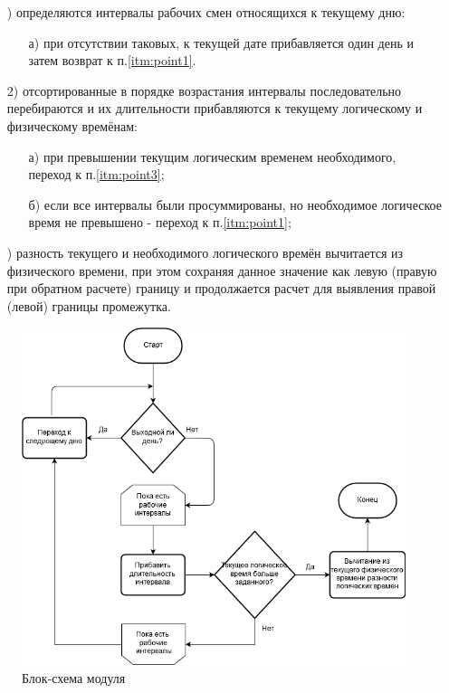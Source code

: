 \begin{enumerate}
	\item[\mylabel{itm:point1}{1})] определяются интервалы рабочих смен относящихся к текущему дню:
	      \begin{enumerate}
		      \item[а)] при отсутствии таковых, к текущей дате прибавляется один день и затем возврат к п.\ref{itm:point1}.
	      \end{enumerate}
	\item[2)] отсортированные в порядке возрастания интервалы последовательно перебираются и их длительности прибавляются к текущему логическому и физическому времёнам:
	      \begin{enumerate}
		      \item[а)] при превышении текущим логическим временем необходимого, переход к п.\ref{itm:point3};
		      \item[б)] если все интервалы были просуммированы, но необходимое логическое время не превышено - переход к п.\ref{itm:point1};
	      \end{enumerate}
	\item[\mylabel{itm:point3}{3})] разность текущего и необходимого логического времён вычитается из физического времени, при этом сохраняя данное значение как левую (правую при обратном расчете) границу и продолжается расчет для выявления правой (левой) границы промежутка.
\end{enumerate}

\begin{figure}[h]
	\includegraphics[width=\linewidth]{pics/scheduleSchema.png}
	\caption{Блок-схема модуля}
	\label{fig:schema}
	\centering
\end{figure}

